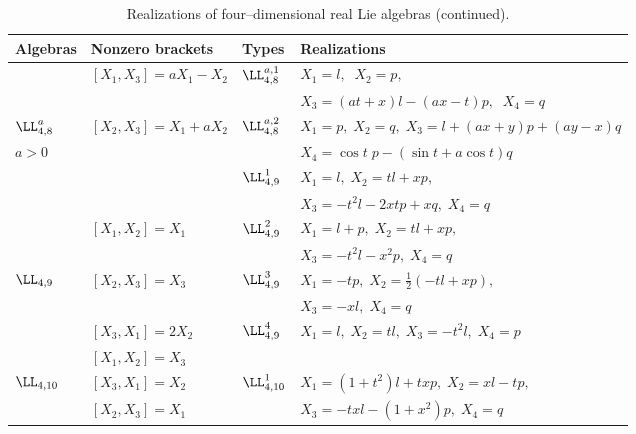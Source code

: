 %
\setcounter{table}{1}
\begin{table}
\label{t5}
\caption{Realizations of four--dimensional real Lie algebras (continued).}
\begin{center}
\begin{tabular}{|l|l|l|l|}
\hline
Algebras & Nonzero brackets & Types & Realizations\\
\hline
 & $[X_1,X_3]=aX_1-X_2$ & $\LL_{4,8}^{a,1}$ & $X_1=l,\;\;X_2=p,$\\
 &  &  & $X_3=(at+x)l-(ax-t)p,\;\;X_4=q$\\
\cline{3-4}
$ \LL_{4,8}^a$ &$[X_2,X_3]=X_1+aX_2$ & $\LL_{4,8}^{a,2} $ & $ X_1=p,\;X_2=q,
                                       \;X_3=l+(ax+y)p+(ay-x)q$\\
$ a>0$ &  &   & $X_4=\cos t\;p -(\sin t+a\cos t)q$\\
\hline     
      &  & $\LL_{4,9}^1$ & $X_1=l,\;X_2=tl+xp,$\\
&  &    &                  $ X_3=-t^2l-2xtp+xq,\;X_4=q$\\  
\cline{3-4}
 & $ [X_1,X_2]=X_1$ & $\LL_{4,9}^2$ & $X_1=l+p,\;X_2=tl+xp,$\\
                                    
             &         &         & $X_3=-t^2l-x^2p,\;X_4=q$\\                                   
\cline{3-4}             
$\LL_{4,9}$ & $[X_2,X_3]=X_3$ & $\LL_{4,9}^3$ & $X_1=-tp,\;
X_2=\displaystyle{\frac{1}{2}}(-tl+xp),$\\ 
  &            &      & $X_3=-xl,\;X_4=q$\\
\cline{3-4}
 & $[X_3,X_1]=2X_2$ & $\LL_{4,9}^4$ & $X_1=l,\;X_2=tl,\;X_3=-t^2l,\;X_4=p$\\
\hline
 & $[X_1,X_2]=X_3$ &     &        \\
$\LL_{4,10}$ & $[X_3,X_1]=X_2$ & $\LL_{4,10}^1$ & $X_1=(1+t^2)l+txp,\; 
                                         X_2=xl-tp,$\\
 &   $[X_2,X_3]=X_1$ &  & $ X_3=-txl-(1+x^2)p,\;X_4=q$\\
\hline
\end{tabular}
\end{center}
\end{table}
